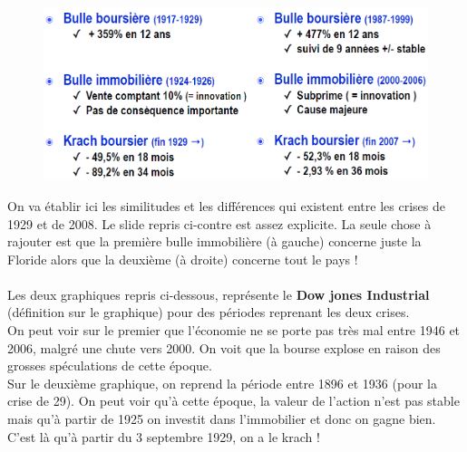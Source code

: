 \begin{figure}
\includegraphics[scale=0.3]{43}
\end{figure}
\noindent On va établir ici les similitudes et les différences qui existent entre les crises de 1929 et de 2008. Le slide repris ci-contre est assez explicite. La seule chose à rajouter est que la première bulle immobilière (à gauche) concerne juste la Floride alors que la deuxième (à droite) concerne tout le pays ! 
\\\\
Les deux graphiques repris ci-dessous, représente le \textbf{Dow jones Industrial} (définition sur le graphique) pour des périodes reprenant les deux crises. \\
On peut voir sur le premier que l'économie ne se porte pas très mal entre 1946 et 2006, malgré une chute vers 2000. On voit que la bourse explose en raison des grosses spéculations de cette époque. \\
Sur le deuxième graphique, on reprend la période entre 1896 et 1936 (pour la crise de 29). On peut voir qu'à cette époque, la valeur de l'action n'est pas stable mais qu'à partir de 1925 on investit dans l'immobilier et donc on gagne bien. C'est là qu'à partir du 3 septembre 1929, on a le krach ! \\

